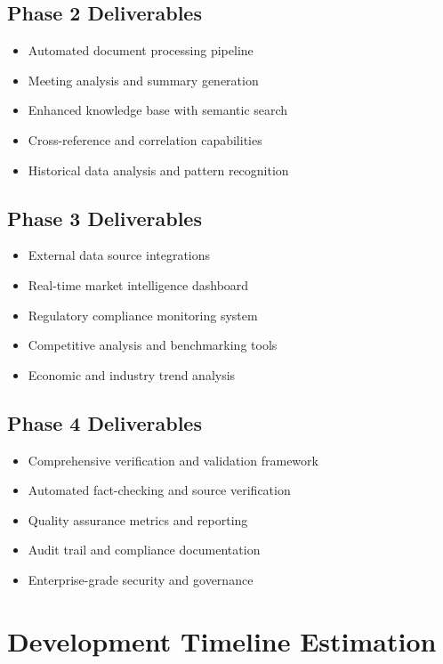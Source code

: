 \documentclass{article}
\begin{document}
\subsection{Phase 2 Deliverables}
\begin{itemize}
    \item Automated document processing pipeline
    \item Meeting analysis and summary generation
    \item Enhanced knowledge base with semantic search
    \item Cross-reference and correlation capabilities
    \item Historical data analysis and pattern recognition
\end{itemize}

\subsection{Phase 3 Deliverables}
\begin{itemize}
    \item External data source integrations
    \item Real-time market intelligence dashboard
    \item Regulatory compliance monitoring system
    \item Competitive analysis and benchmarking tools
    \item Economic and industry trend analysis
\end{itemize}

\subsection{Phase 4 Deliverables}
\begin{itemize}
    \item Comprehensive verification and validation framework
    \item Automated fact-checking and source verification
    \item Quality assurance metrics and reporting
    \item Audit trail and compliance documentation
    \item Enterprise-grade security and governance
\end{itemize}

\section{Development Timeline Estimation}
\end{document}
